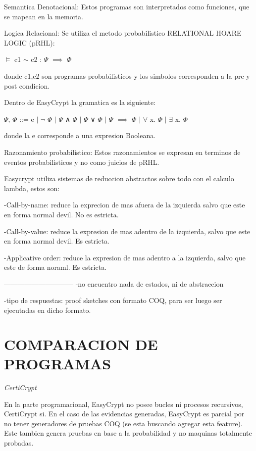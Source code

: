 \documentclass[runningheads,a4paper]{llncs}
\begin{document}
Semantica Denotacional:
Estos programas son interpretados como funciones, que se mapean en la memoria.

Logica Relacional: Se utiliza el metodo probabilistico RELATIONAL HOARE LOGIC (pRHL):
		
\centerline{$\models$ c1 $\sim$ c2 : $\Psi$ $\implies$ $\Phi$}	
			
donde c1,c2 son programas probabilisticos y los simbolos corresponden a la pre y post condicion.

Dentro de EasyCrypt la gramatica es la siguiente:

\centerline{$\Psi$, $\Phi$ ::= e $\mid$ $\neg$ $\Phi$ $\mid$ $\Psi$ ∧ $\Phi$ $\mid$ $\Psi$ ∨ $\Phi$ $\mid$ $\Psi$ $\implies$ $\Phi$ $\mid$ $\forall$ x. $\Phi$ $\mid$ $\exists$ x. $\Phi$}

donde la e corresponde a una expresion Booleana.


Razonamiento probabilistico:
Estos razonamientos se expresan en terminos de eventos probabilisticos y no como juicios de pRHL.\cite{article5}


Easycrypt utiliza sistemas de reduccion abstractos sobre todo con el calculo lambda, estos son:

	-Call-by-name: reduce la exprecion de mas afuera de la izquierda salvo que este en forma normal devil. No es estricta.

	-Call-by-value: reduce la expresion de mas adentro de la izquierda, salvo que este en forma normal devil. Es estricta.

	-Applicative order: reduce la expresion de mas adentro a la izquierda, salvo que este de forma noraml. Es estricta.\cite{article6}


------------------------------
-no encuentro nada de estados, ni de abstraccion

-tipo de respuestas: proof sketches con formato COQ, para ser luego ser ejecutadas en dicho formato.


\section{COMPARACION DE PROGRAMAS}
\centerline{\emph{CertiCrypt}}

En la parte programacional, EasyCrypt no posee bucles ni procesos recursivos, CertiCrypt si. En el caso de las evidencias generadas, EasyCrypt es parcial por no tener generadores de pruebas COQ (se esta buscando agregar esta feature). Este tambien genera pruebas en base a la probabilidad y no maquinas totalmente probadas.
\end{document}
